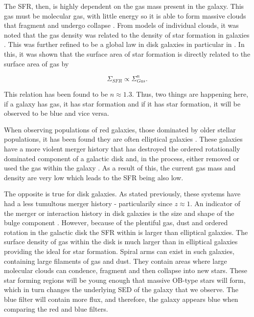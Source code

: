The SFR, then, is highly dependent on the gas mass present in the galaxy. This gas must be molecular gas, with little energy so it is able to form massive clouds that fragment and undergo collapse \citep{1965MNRAS.130...97G, 1972ApJ...176L...9Q}. From models of individual clouds, it was noted that the gas density was related to the density of star formation in galaxies \citep{1959ApJ...129..243S}. This was further refined to be a global law in disk galaxies in particular in \citet{1998ApJ...498..541K}. In this, it was shown that the surface area of star formation is directly related to the surface area of gas by 

\begin{equation}\label{eq:ks-law}
\Sigma_{SFR} \propto \Sigma_{Gas}^{n}. 
\end{equation}

\noindent This relation has been found to be $n\approx1.3$. Thus, two things are happening here, if a galaxy has gas, it has star formation and if it has star formation, it will be observed to be blue and vice versa.

When observing populations of red galaxies, those dominated by older stellar populations, it has been found they are often elliptical galaxies \citep{1992MNRAS.254..589B}. These galaxies have a more violent merger history that has destroyed the ordered rotationally dominated component of a galactic disk and, in the process, either removed or used the gas within the galaxy \citep{1976ApJ...204..365F}. As a result of this, the current gas mass and density are very low which leads to the SFR being also low.

The opposite is true for disk galaxies. As stated previously, these systems have had a less tumultous merger history - particularily since $z \approx 1$. An indicator of the merger or interaction history in disk galaxies is the size and shape of the bulge component \citep{2011MNRAS.414..888E}. However, because of the plentiful gas, dust and ordered rotation in the galactic disk the SFR within is larger than elliptical galaxies. The surface density of gas within the disk is much larger than in elliptical galaxies providing the ideal for star formation. Spiral arms can exist in such galaxies, containing large filaments of gas and dust. They contain areas where large molecular clouds can condence, fragment and then collapse into new stars. These star forming regions will be young enough that massive OB-type stars will form, which in turn changes the underlying SED of the galaxy that we observe. The blue filter will contain more flux, and therefore, the galaxy appears blue when comparing the red and blue filters.

